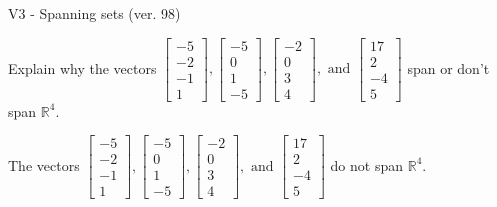 \begin{exercise}
  \begin{exerciseTitle}V3 - Spanning sets (ver. 98)\end{exerciseTitle}
  \begin{exerciseStatement}
    Explain why the vectors \(\left[\begin{array}{r}
-5 \\
-2 \\
-1 \\
1
\end{array}\right] , \left[\begin{array}{r}
-5 \\
0 \\
1 \\
-5
\end{array}\right] , \left[\begin{array}{r}
-2 \\
0 \\
3 \\
4
\end{array}\right] , \text{ and } \left[\begin{array}{r}
17 \\
2 \\
-4 \\
5
\end{array}\right]\) span or don't span \(\mathbb{R}^4\). 
	


  \end{exerciseStatement}
  \begin{exerciseAnswer}
   The vectors \(\left[\begin{array}{r}
-5 \\
-2 \\
-1 \\
1
\end{array}\right] , \left[\begin{array}{r}
-5 \\
0 \\
1 \\
-5
\end{array}\right] , \left[\begin{array}{r}
-2 \\
0 \\
3 \\
4
\end{array}\right] , \text{ and } \left[\begin{array}{r}
17 \\
2 \\
-4 \\
5
\end{array}\right]\) 
  	 do not  
	span \(\mathbb{R}^4\).
  


  \end{exerciseAnswer}
\end{exercise}